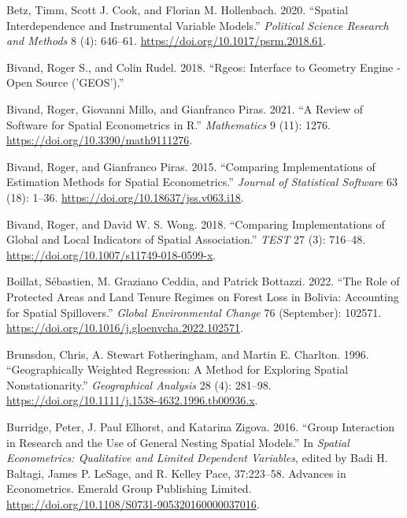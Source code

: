 \documentclass[
  letterpaper,
]{scrbook}
\newlength{\cslhangindent}
\newlength{\cslentryspacingunit} %
\newenvironment{CSLReferences}[2] %
 {%
  \setlength{\parindent}{0pt}
  \ifodd #1
  \let\oldpar\par
  \def\par{\hangindent=\cslhangindent\oldpar}
  \fi
  \setlength{\parskip}{#2\cslentryspacingunit}
 }%
 {}
\begin{document}
\begin{CSLReferences}{1}{0}
\leavevmode{}%
Betz, Timm, Scott J. Cook, and Florian M. Hollenbach. 2020. {``Spatial
Interdependence and Instrumental Variable Models.''} \emph{Political
Science Research and Methods} 8 (4): 646--61.
\url{https://doi.org/10.1017/psrm.2018.61}.

\leavevmode{}%
Bivand, Roger S., and Colin Rudel. 2018. {``Rgeos: {Interface} to
{Geometry Engine} - {Open Source} ('{GEOS}').''}

\leavevmode{}%
Bivand, Roger, Giovanni Millo, and Gianfranco Piras. 2021. {``A {Review}
of {Software} for {Spatial Econometrics} in {R}.''} \emph{Mathematics} 9
(11): 1276. \url{https://doi.org/10.3390/math9111276}.

\leavevmode{}%
Bivand, Roger, and Gianfranco Piras. 2015. {``Comparing
{Implementations} of {Estimation Methods} for {Spatial Econometrics}.''}
\emph{Journal of Statistical Software} 63 (18): 1--36.
\url{https://doi.org/10.18637/jss.v063.i18}.

\leavevmode{}%
Bivand, Roger, and David W. S. Wong. 2018. {``Comparing Implementations
of Global and Local Indicators of Spatial Association.''} \emph{TEST} 27
(3): 716--48. \url{https://doi.org/10.1007/s11749-018-0599-x}.

\leavevmode{}%
Boillat, Sébastien, M. Graziano Ceddia, and Patrick Bottazzi. 2022.
{``The Role of Protected Areas and Land Tenure Regimes on Forest Loss in
{Bolivia}: {Accounting} for Spatial Spillovers.''} \emph{Global
Environmental Change} 76 (September): 102571.
\url{https://doi.org/10.1016/j.gloenvcha.2022.102571}.

\leavevmode{}%
Brunsdon, Chris, A. Stewart Fotheringham, and Martin E. Charlton. 1996.
{``Geographically {Weighted Regression}: {A Method} for {Exploring
Spatial Nonstationarity}.''} \emph{Geographical Analysis} 28 (4):
281--98. \url{https://doi.org/10.1111/j.1538-4632.1996.tb00936.x}.

\leavevmode{}%
Burridge, Peter, J. Paul Elhorst, and Katarina Zigova. 2016. {``Group
{Interaction} in {Research} and the {Use} of {General Nesting Spatial
Models}.''} In \emph{Spatial {Econometrics}: {Qualitative} and {Limited
Dependent Variables}}, edited by Badi H. Baltagi, James P. LeSage, and
R. Kelley Pace, 37:223--58. Advances in {Econometrics}. {Emerald Group
Publishing Limited}.
\url{https://doi.org/10.1108/S0731-905320160000037016}.


\end{CSLReferences}
\end{document}
